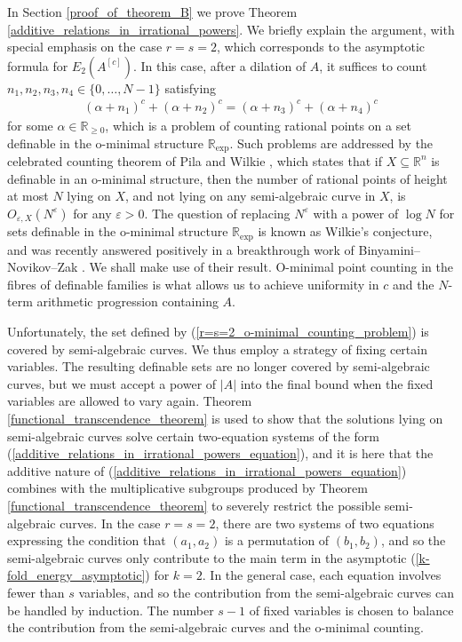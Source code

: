 \documentclass[9pt]{amsart}
\theoremstyle{my_theorem_style}
\numberwithin{definition}{section}
\newcommand{\eps}{\varepsilon}
\newcommand{\R}{\mathbb{R}}
\begin{document}
In Section \ref{proof_of_theorem_B} we prove Theorem \ref{additive_relations_in_irrational_powers}. We briefly explain the argument, with special emphasis on the case $r = s = 2$, which corresponds to the asymptotic formula for $E_2(A^{[c]})$. In this case, after a dilation of $A$, it suffices to count $n_1, n_2, n_3, n_4 \in \{0, \dots, N - 1\}$ satisfying
\begin{align}
\label{r=s=2_o-minimal_counting_problem}
    (\alpha + n_1)^c + (\alpha + n_2)^c = (\alpha + n_3)^c + (\alpha + n_4)^c
\end{align}
for some $\alpha \in \R_{\geq 0}$, which is a problem of counting rational points on a set definable in the o-minimal structure $\R_{\exp}$. Such problems are addressed by the celebrated counting theorem of Pila and Wilkie \cite[Theorem 1.8]{Pila--Wilkie_the_rational_points_on_a_definable_set}, which states that if $X \subseteq \R^n$ is definable in an o-minimal structure, then the number of rational points of height at most $N$ lying on $X$, and not lying on any semi-algebraic curve in $X$, is $O_{\eps, X}(N^\eps)$ for any $\eps > 0$. The question of replacing $N^\eps$ with a power of $\log N$ for sets definable in the o-minimal structure $\R_{\exp}$ is known as Wilkie's conjecture, and was recently answered positively in a breakthrough work of Binyamini--Novikov--Zak \cite{Binyamini--Novikov--Zak_Wilkie's_conjecture_for_Pfaffian_structures}. We shall make use of their result. O-minimal point counting in the fibres of definable families is what allows us to achieve uniformity in $c$ and the $N$-term arithmetic progression containing $A$.

Unfortunately, the set defined by (\ref{r=s=2_o-minimal_counting_problem}) is covered by semi-algebraic curves. We thus employ a strategy of fixing certain variables. The resulting definable sets are no longer covered by semi-algebraic curves, but we must accept a power of $|A|$ into the final bound when the fixed variables are allowed to vary again. Theorem \ref{functional_transcendence_theorem} is used to show that the solutions lying on semi-algebraic curves solve certain two-equation systems of the form (\ref{additive_relations_in_irrational_powers_equation}), and it is here that the additive nature of (\ref{additive_relations_in_irrational_powers_equation}) combines with the multiplicative subgroups produced by Theorem \ref{functional_transcendence_theorem} to severely restrict the possible semi-algebraic curves. In the case $r = s = 2$, there are two systems of two equations expressing the condition that $(a_1, a_2)$ is a permutation of $(b_1, b_2)$, and so the semi-algebraic curves only contribute to the main term in the asymptotic (\ref{k-fold_energy_asymptotic}) for $k = 2$. In the general case, each equation involves fewer than $s$ variables, and so the contribution from the semi-algebraic curves can be handled by induction. The number $s - 1$ of fixed variables is chosen to balance the contribution from the semi-algebraic curves and the o-minimal counting.
\end{document}

